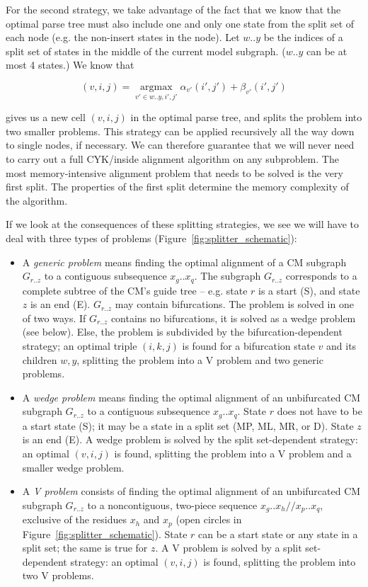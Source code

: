 \documentclass[11pt]{article}
\def\argmax{\mathop{\mathrm{argmax}}\limits}
\begin{document}
For the second strategy, we take advantage of the fact that we know
that the optimal parse tree must also include one and only one state
from the split set of each node (e.g. the non-insert states in the
node). Let $w..y$ be the indices of a split set of states in the
middle of the current model subgraph. ($w..y$ can be at most 4
states.)  We know that

\[
(v,i,j) = \argmax_{v' \in w..y,i',j'} \alpha_{v'}(i',j') + \beta_{v'}(i',j')
\]

gives us a new cell $(v,i,j)$ in the optimal parse tree, and splits
the problem into two smaller problems. This strategy can be applied
recursively all the way down to single nodes, if necessary. We can
therefore guarantee that we will never need to carry out a full
CYK/inside alignment algorithm on any subproblem. The most
memory-intensive alignment problem that needs to be solved is the very
first split.  The properties of the first split determine the memory
complexity of the algorithm.

If we look at the consequences of these splitting strategies, we see
we will have to deal with three types of problems
(Figure~\ref{fig:splitter_schematic}):

\begin{itemize}
\item A \emph{generic problem} means finding the optimal alignment of
a CM subgraph $G_{r..z}$ to a contiguous subsequence $x_g..x_q$. The
subgraph $G_{r..z}$ corresponds to a complete subtree of the CM's
guide tree -- e.g. state $r$ is a start (S), and state $z$ is an end
(E). $G_{r..z}$ may contain bifurcations. The problem is solved in one
of two ways. If $G_{r..z}$ contains no bifurcations, it is solved as a
wedge problem (see below). Else, the problem is subdivided by the
bifurcation-dependent strategy; an optimal triple $(i,k,j)$ is found
for a bifurcation state $v$ and its children $w,y$, splitting the
problem into a V problem and two generic problems.

\item A \emph{wedge problem} means finding the optimal alignment of an
unbifurcated CM subgraph $G_{r..z}$ to a contiguous subsequence
$x_g..x_q$. State $r$ does not have to be a start state (S); it may be
a state in a split set (MP, ML, MR, or D). State $z$ is an end (E).  A
wedge problem is solved by the split set-dependent strategy: an
optimal $(v,i,j)$ is found, splitting the problem into a V problem and
a smaller wedge problem.

\item A \emph{V problem} consists of finding the optimal alignment of
an unbifurcated CM subgraph $G_{r..z}$ to a noncontiguous, two-piece
sequence $x_g..x_h//x_p..x_q$, exclusive of the residues $x_h$ and
$x_p$ (open circles in Figure~\ref{fig:splitter_schematic}).  State
$r$ can be a start state or any state in a split set; the same is true
for $z$. A V problem is solved by a split set-dependent strategy: an
optimal $(v,i,j)$ is found, splitting the problem into two V problems.
\end{itemize}
\end{document}
